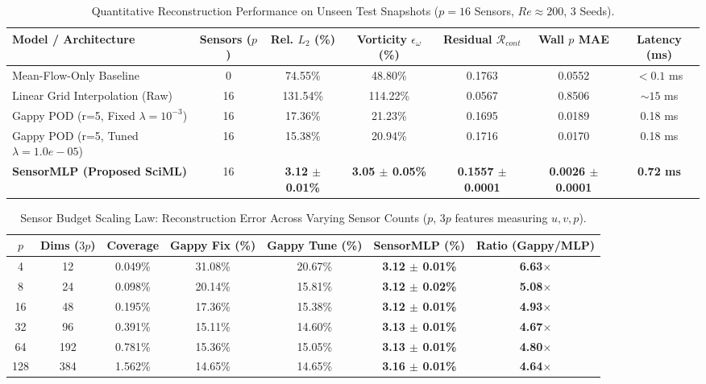 \begin{table}[h!]
\centering
\caption{Quantitative Reconstruction Performance on Unseen Test Snapshots ($p = 16$ Sensors, $Re \approx 200$, 3 Seeds).}
\label{tab:nominal_benchmark_p16}
\begin{tabular}{lcccccc}
\toprule
\textbf{Model / Architecture} & \textbf{Sensors ($p$)} & \textbf{Rel. $L_2$ (\%)} & \textbf{Vorticity $\epsilon_\omega$ (\%)} & \textbf{Residual $\mathcal{R}_{cont}$} & \textbf{Wall $p$ MAE} & \textbf{Latency (ms)} \\
\midrule
Mean-Flow-Only Baseline & 0 & 74.55\% & 48.80\% & 0.1763 & 0.0552 & $< 0.1$ ms \\
Linear Grid Interpolation (Raw) & 16 & 131.54\% & 114.22\% & 0.0567 & 0.8506 & $\sim 15$ ms \\
Gappy POD (r=5, Fixed $\lambda = 10^{-3}$) & 16 & 17.36\% & 21.23\% & 0.1695 & 0.0189 & 0.18 ms \\
Gappy POD (r=5, Tuned $\lambda = 1.0e-05$) & 16 & 15.38\% & 20.94\% & 0.1716 & 0.0170 & 0.18 ms \\
\textbf{SensorMLP (Proposed SciML)} & 16 & \textbf{3.12 $\pm$ 0.01\%} & \textbf{3.05 $\pm$ 0.05\%} & \textbf{0.1557 $\pm$ 0.0001} & \textbf{0.0026 $\pm$ 0.0001} & \textbf{0.72 ms} \\
\bottomrule
\end{tabular}
\end{table}

\begin{table}[h!]
\centering
\caption{Sensor Budget Scaling Law: Reconstruction Error Across Varying Sensor Counts ($p$, $3p$ features measuring $u, v, p$).}
\label{tab:sensor_scaling_sweep}
\begin{tabular}{ccccccc}
\toprule
\textbf{$p$} & \textbf{Dims ($3p$)} & \textbf{Coverage} & \textbf{Gappy Fix (\%)} & \textbf{Gappy Tune (\%)} & \textbf{SensorMLP (\%)} & \textbf{Ratio (Gappy/MLP)} \\
\midrule
4 & 12 & 0.049\% & 31.08\% & 20.67\% & \textbf{3.12 $\pm$ 0.01\%} & \textbf{6.63$\times$} \\
8 & 24 & 0.098\% & 20.14\% & 15.81\% & \textbf{3.12 $\pm$ 0.02\%} & \textbf{5.08$\times$} \\
16 & 48 & 0.195\% & 17.36\% & 15.38\% & \textbf{3.12 $\pm$ 0.01\%} & \textbf{4.93$\times$} \\
32 & 96 & 0.391\% & 15.11\% & 14.60\% & \textbf{3.13 $\pm$ 0.01\%} & \textbf{4.67$\times$} \\
64 & 192 & 0.781\% & 15.36\% & 15.05\% & \textbf{3.13 $\pm$ 0.01\%} & \textbf{4.80$\times$} \\
128 & 384 & 1.562\% & 14.65\% & 14.65\% & \textbf{3.16 $\pm$ 0.01\%} & \textbf{4.64$\times$} \\
\bottomrule
\end{tabular}
\end{table}

